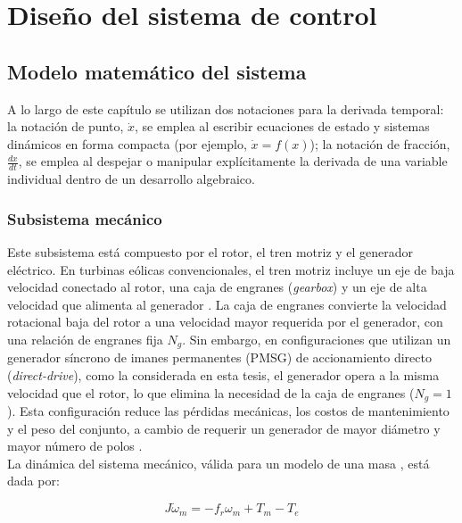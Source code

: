 \chapter{Diseño del sistema de control}

\section{Modelo matemático del sistema}

A lo largo de este capítulo se utilizan dos notaciones para la derivada
temporal: la notación de punto, $\dot{x}$, se emplea al escribir
ecuaciones de estado y sistemas dinámicos en forma compacta (por ejemplo,
$\dot{x} = f(x)$); la notación de fracción, $\frac{dx}{dt}$, se emplea
al despejar o manipular explícitamente la derivada de una variable individual
dentro de un desarrollo algebraico.


\subsection{Subsistema mecánico}

Este subsistema está compuesto por el rotor, el tren motriz y el generador 
eléctrico. En turbinas eólicas convencionales, el tren motriz incluye un 
eje de baja velocidad conectado al rotor, una caja de engranes 
(\emph{gearbox}) y un eje de alta velocidad que alimenta al generador 
\cite{soltani2013}. La caja de engranes convierte la velocidad rotacional 
baja del rotor a una velocidad mayor requerida por el generador, con una 
relación de engranes fija $N_g$. Sin embargo, en configuraciones que 
utilizan un generador síncrono de imanes permanentes (PMSG) de 
accionamiento directo (\emph{direct-drive}), como la considerada en esta 
tesis, el generador opera a la misma velocidad que el rotor, lo que 
elimina la necesidad de la caja de engranes ($N_g = 1$). Esta 
configuración reduce las pérdidas mecánicas, los costos de mantenimiento y 
el peso del conjunto, a cambio de requerir un generador de mayor diámetro 
y mayor número de polos \cite{Burton2011}.
\\

La dinámica del sistema mecánico, válida para un modelo de una masa 
\cite{soltani2013}, está dada por:

\begin{equation}
    J \dot{\omega}_m = -f_r \omega_m + T_m - T_e
    \label{eq:torque_balance_simplified}
\end{equation}

